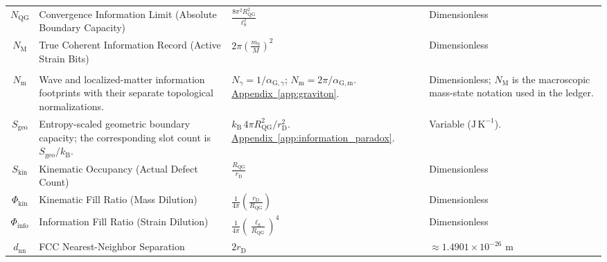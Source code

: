 \begin{longtable}{@{} c p{5.5cm} p{4cm} p{3.5cm} @{}}
$N_{\mathrm{QG}}$ & Convergence Information Limit (Absolute Boundary Capacity) & $\frac{8\pi^2 R_{\mathrm{QG}}^2}{\ell_{\mathrm{S}}^2}$ & Dimensionless \\

$N_{\mathrm{M}}$ & True Coherent Information Record (Active Strain Bits) & $2\pi \left(\frac{m_{\mathrm{S}}}{M}\right)^2$ & Dimensionless \\

\begin{tabular}[c]{@{}c@{}}$N_\gamma$ \\ $N_{\mathrm m}$\end{tabular} & {\raggedright Wave and localized-matter information footprints with their separate topological normalizations.\par} & {\raggedright $N_\gamma=1/\alpha_{\mathrm G,\gamma}$; $N_{\mathrm m}=2\pi/\alpha_{\mathrm G,\mathrm m}$. \newline \hyperref[app:graviton]{Appendix~\ref*{app:graviton}}.\par} & {\raggedright Dimensionless; $N_{\mathrm M}$ is the macroscopic mass-state notation used in the ledger.\par} \\


$S_{\mathrm{geo}}$ & {\raggedright Entropy-scaled geometric boundary capacity; the corresponding slot count is $S_{\mathrm{geo}}/k_{\mathrm B}$.\par} & {\raggedright $k_{\mathrm B}\,4\pi R_{\mathrm{QG}}^2/r_{\mathrm D}^2$. \newline \hyperref[app:information_paradox]{Appendix~\ref*{app:information_paradox}}.\par} & {\raggedright Variable ($\mathrm{J\,K^{-1}}$).\par} \\

$S_{\mathrm{kin}}$ & Kinematic Occupancy (Actual Defect Count) & $\frac{R_{\mathrm{QG}}}{r_{\mathrm{D}}}$ & Dimensionless \\

$\Phi_{\mathrm{kin}}$ & Kinematic Fill Ratio (Mass Dilution) & $\frac{1}{4\pi} \left(\frac{r_{\mathrm{D}}}{R_{\mathrm{QG}}}\right)$ & Dimensionless \\

$\Phi_{\mathrm{info}}$ & Information Fill Ratio (Strain Dilution) & $\frac{1}{4\pi} \left(\frac{\ell_{\mathrm{S}}}{R_{\mathrm{QG}}}\right)^4$ & Dimensionless \\

$d_{\mathrm{nn}}$ & FCC Nearest-Neighbor Separation & $2r_{\mathrm{D}}$ & $\approx 1.4901 \times 10^{-26} \text{ m}$ \\


\end{longtable}
